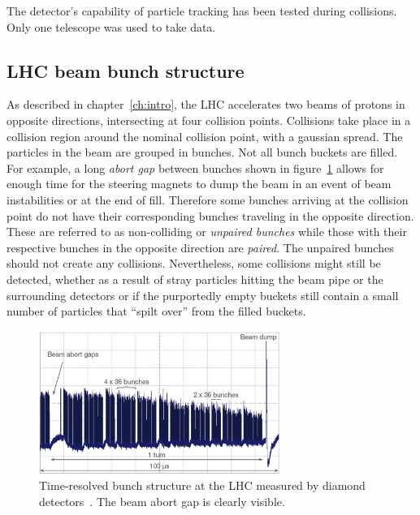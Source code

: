 
The detector's capability of particle tracking has been tested during collisions. Only one telescope was used to take data. 

\subsection{LHC beam bunch structure}
As described in chapter~\ref{ch:intro}, the LHC accelerates two beams of protons in opposite directions, intersecting at four collision points. Collisions take place in a collision region around the nominal collision point, with a gaussian spread. The particles in the beam are grouped in bunches. Not all bunch buckets are filled. For example, a long \emph{abort gap} between bunches shown in figure~\ref{fig:lhcbunch} allows for enough time for the steering magnets to dump the beam in an event of beam instabilities or at the end of fill. Therefore some bunches arriving at the collision point do not have their corresponding bunches traveling in the opposite direction. These are referred to as non-colliding or \emph{unpaired bunches} while those with their respective bunches in the opposite direction are \emph{paired}. The unpaired bunches should not create any collisions. Nevertheless, some collisions might still be detected, whether as a result of stray particles hitting the beam pipe or the surrounding detectors or if the purportedly empty buckets still contain a small number of particles that ``spilt over'' from the filled buckets.
\begin{figure}[!t]
\centering
\includegraphics[width=0.7\textwidth]{04_charge_monitoring/pics/lhcbunch}
\caption{Time-resolved bunch structure at the LHC measured by diamond detectors~\cite{GRIES:00005}. The beam abort gap is clearly visible.}
\label{fig:lhcbunch}
\end{figure}

